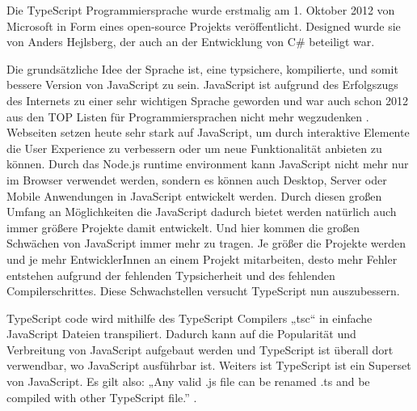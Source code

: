 Die TypeScript Programmiersprache wurde erstmalig am 1. Oktober 2012 
\cite{TypeScriptCodePlexArchived} von 
Microsoft in Form eines open-source Projekts veröffentlicht. Designed wurde sie 
von Anders Hejlsberg, der auch an der Entwicklung von C\# beteiligt war. 

Die grundsätzliche Idee der Sprache ist, eine typsichere, kompilierte, und somit 
bessere Version von JavaScript zu sein. JavaScript ist aufgrund des Erfolgszugs
des Internets zu einer sehr wichtigen Sprache geworden und war auch schon 2012 
aus den TOP Listen für Programmiersprachen nicht mehr wegzudenken 
\cite{StackOverflowSurvey,TIOBEIndex,PYPL}. 
Webseiten setzen heute sehr stark auf JavaScript, um durch interaktive Elemente 
die User Experience zu verbessern oder um neue Funktionalität anbieten zu können. 
Durch das Node.js runtime environment kann JavaScript nicht mehr nur im Browser 
verwendet werden, sondern es können auch Desktop, Server oder Mobile Anwendungen 
in JavaScript entwickelt werden. Durch diesen großen Umfang an Möglichkeiten die 
JavaScript dadurch bietet werden natürlich auch immer größere Projekte damit entwickelt. 
Und hier kommen die großen Schwächen von JavaScript immer mehr zu tragen. 
Je größer die Projekte werden und je mehr EntwicklerInnen an einem Projekt 
mitarbeiten, desto mehr Fehler entstehen aufgrund der fehlenden Typsicherheit
und des fehlenden Compilerschrittes. Diese Schwachstellen versucht TypeScript 
nun auszubessern.

TypeScript code wird mithilfe des TypeScript Compilers „tsc“ in einfache JavaScript 
Dateien transpiliert. Dadurch kann auf die Popularität und Verbreitung von JavaScript 
aufgebaut werden und TypeScript ist überall dort verwendbar, wo JavaScript 
ausführbar ist. Weiters ist TypeScript ist ein Superset von JavaScript. 
Es gilt also: „Any valid .js file can be renamed .ts and be compiled with other 
TypeScript file.” \cite{MaharryDanTR}. 

